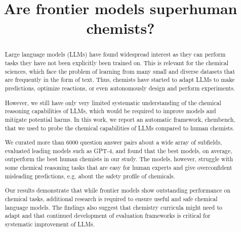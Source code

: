 \documentclass[11pt, oneside]{article}
\title{\textsf{Are frontier models superhuman chemists?}}
\begin{document}
\maketitle

\begin{abstract}
    Large language models (LLMs) have found widespread interest as they can perform tasks they have not been explicitly been trained on. 
    This is relevant for the chemical sciences, which face the problem of learning from many small and diverse datasets that are frequently in the form of text.
    Thus, chemists have started to adapt LLMs to make predictions, optimize reactions, or even autonomously design and perform experiments.

    However, we still have only very limited systematic understanding of the chemical reasoning capabilities of LLMs, which would be required to improve models and mitigate potential harms. 
    In this work, we report an automatic framework, chembench, that we used to probe the chemical capabilities of LLMs compared to human chemists.

    We curated more than 6000 question answer pairs about a wide array of subfields, evaluated leading models such as GPT-4, and found that the best models, on average, outperform the best human chemists in our study. 
    The models, however, struggle with some chemical reasoning tasks that are easy for human experts and give overconfident misleading predictions, e.g. about the safety profile of chemicals. 

    Our results demonstrate that while frontier models show outstanding performance on chemical tasks, additional research is required to ensure useful and safe chemical language models. 
    The findings also suggest that chemistry curricula might need to adapt and that continued development of evaluation frameworks is critical for systematic improvement of LLMs.
\end{abstract}

\clearpage
\end{document}
